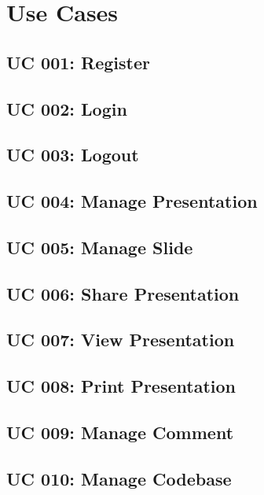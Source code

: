 \chapter{Use Cases}
\label{usecases}

\section{UC 001: Register}
\label{uc:001-register}


\section{UC 002: Login}
\label{uc:002-login}


\section{UC 003: Logout}
\label{uc:003-logout}


\section{UC 004: Manage Presentation}
\label{uc:004-manage-pres}


\section{UC 005: Manage Slide}
\label{uc:005-manage-slide}


\section{UC 006: Share Presentation}
\label{uc:006-share-pres}


\section{UC 007: View Presentation}
\label{uc:007-view-pres}


\section{UC 008: Print Presentation}
\label{uc:008-print-pres}


\section{UC 009: Manage Comment}
\label{uc:009-manage-comment}


\section{UC 010: Manage Codebase}
\label{uc:010-manage-codebase}


